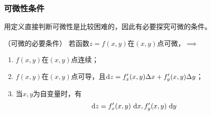 \subsubsection{可微性条件}
用定义直接判断可微性是比较困难的，因此有必要探究可微的条件。
\begin{theorem}
    （可微的必要条件）
    若函数$z=f(x,y)$在$(x,y)$点可微，$\implies$
    \begin{enumerate}[(1)]
        \item $f(x,y)$在$(x,y)$点连续；
        \item $f(x,y)$在$(x,y)$点可导，且$\mathop{}\!\mathrm{d} z = f'_x(x,y)\Delta x+ f'_y(x,y)\Delta y$；
        \item 当$x,y$为自变量时，有
              \[ \mathop{}\!\mathrm{d} z = f'_x(x,y)\,\mathop{}\!\mathrm{d} x, f'_y(x,y)\,\mathop{}\!\mathrm{d} y \]
    \end{enumerate}
\end{theorem}

